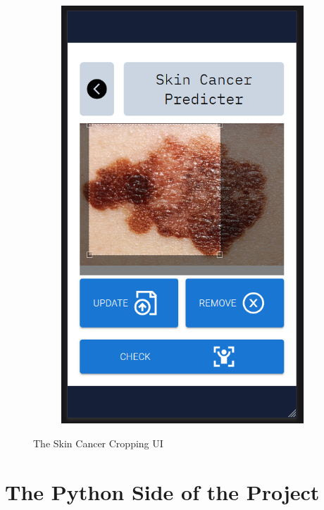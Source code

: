 \documentclass[]{final_report}
\begin{document}
\begin{figure}[ht!]
\begin{subfigure}{0.4\textwidth}
    \includegraphics[width=\linewidth]{images/UI-screenshot-clear.png}
    \label{fig:Clear-Cropping}
  \end{subfigure}
  \caption{The Skin Cancer Cropping UI}
  \label{fig:UI-Cropping}
\end{figure}


\section{The Python Side of the Project}
\end{document}
